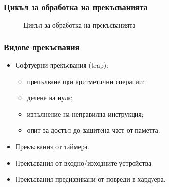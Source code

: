 \documentclass[ignorenonframetext, hyperref=unicode]{beamer}
\begin{document}
\begin{frame}
\frametitle{Цикъл за обработка на прекъсванията}
\begin{figure}[h]
\center
{}
\caption{Цикъл за обработка на прекъсванията}
\end{figure}
\end{frame}



\begin{frame}
\frametitle{Видове прекъсвания}
\begin{itemize}
\item Софтуерни прекъсвания (trap):
\begin{itemize}
  \item препълване при аритметични операции;
  \item делене на нула;
  \item изпълнение на неправилна инструкция;
  \item опит за достъп до защитена част от паметта.
\end{itemize}
\item Прекъсвания от таймера.
\item Прекъсвания от входно/изходните устройства.
\item Прекъсвания предизвикани от повреди в хардуера.
\end{itemize}
\end{frame}
\end{document}
